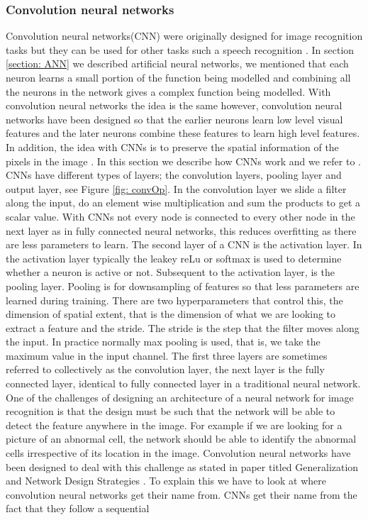 \documentclass[a4paper,11pt]{article}
\begin{document}
\subsubsection{Convolution neural networks}
\label{convolution}
Convolution neural networks(CNN) were originally designed for image recognition tasks but they can be used for other tasks such a speech recognition \citep{John}. In section \ref{section: ANN} we described artificial neural networks, we mentioned that each neuron learns a small portion of the function being modelled and combining all the neurons in the network gives a complex function being modelled. With convolution neural networks the idea is the same however, convolution neural networks have been designed so that the earlier  neurons learn low level visual features and the later neurons combine these features to learn high level features. In addition, the idea with CNNs is to preserve the spatial information of the pixels in the image \citep{John}. In this section we describe how CNNs work and we refer to \cite{Ian}. CNNs have different types of layers; the convolution layers, pooling layer and output layer, see Figure \ref{fig: convOp}. In the convolution layer we slide a filter along the input, do an element wise multiplication and sum the products to get a scalar value. With CNNs not every node is connected to every other node in the next layer as in fully connected neural networks, this reduces overfitting as there are less parameters to learn. The second layer of a CNN is the activation layer. In the activation layer typically the leakey reLu or softmax is used to determine whether a neuron is active or not. Subsequent to the activation layer, is the pooling layer. Pooling is for downsampling of features so that less parameters are learned during training. There are two hyperparameters that control this, the dimension of spatial extent, that is the dimension of what we are looking to extract a feature and the stride. The stride is the step that the filter moves along the input. In practice normally max pooling is used, that is, we take the maximum value in the input channel. The first three layers are sometimes referred to collectively as the convolution layer, the next layer is the fully connected layer, identical to fully connected layer in a traditional neural network.  One of the challenges of designing an architecture of a neural network for image recognition is that the design must be such that the network will be able to detect the feature anywhere in the image. For example if we are looking for a picture of an abnormal cell, the network should be able to identify the abnormal cells irrespective of its location in the image. Convolution neural networks have been designed to deal with this challenge as \cite{Yann} stated in paper titled Generalization and Network Design Strategies . To explain this we have to look at where convolution neural networks get their name from. CNNs get their name from the fact that they follow a sequential 
\end{document}
